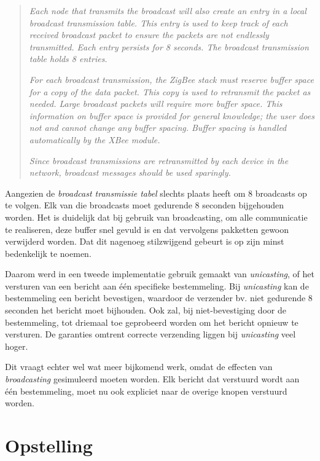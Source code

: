 \begin{quote}

\emph{Each node that transmits the broadcast will also create an entry in a
local broadcast transmission table. This entry is used to keep track of each
received broadcast packet to ensure the packets are not endlessly transmitted.
Each entry persists for 8 seconds. The broadcast transmission table holds 8
entries.}

\emph{For each broadcast transmission, the ZigBee stack must reserve buffer
space for a copy of the data packet. This copy is used to retransmit the packet
as needed. Large broadcast packets will require more buffer space. This
information on buffer space is provided for general knowledge; the user does
not and cannot change any buffer spacing. Buffer spacing is handled
automatically by the XBee module.}

\emph{Since broadcast transmissions are retransmitted by each device in the
network, broadcast messages should be used sparingly.}

\end{quote}

Aangezien de \emph{broadcast transmissie tabel} slechts plaats heeft om 8
broadcasts op te volgen. Elk van die broadcasts moet gedurende 8 seconden
bijgehouden worden. Het is duidelijk dat bij gebruik van broadcasting, om alle
communicatie te realiseren, deze buffer snel gevuld is en dat vervolgens
pakketten gewoon verwijderd worden. Dat dit nagenoeg stilzwijgend gebeurt is
op zijn minst bedenkelijk te noemen.

Daarom werd in een tweede implementatie gebruik gemaakt van \emph{unicasting},
of het versturen van een bericht aan \'e\'en specifieke bestemmeling. Bij
\emph{unicasting} kan de bestemmeling een bericht bevestigen, waardoor de
verzender bv. niet gedurende 8 seconden het bericht moet bijhouden. Ook zal,
bij niet-bevestiging door de bestemmeling, tot driemaal toe geprobeerd worden
om het bericht opnieuw te versturen. De garanties omtrent correcte verzending
liggen bij \emph{unicasting} veel hoger.

Dit vraagt echter wel wat meer bijkomend werk, omdat de effecten van
\emph{broadcasting} gesimuleerd moeten worden. Elk bericht dat verstuurd wordt
aan \'e\'en bestemmeling, moet nu ook expliciet naar de overige knopen
verstuurd worden.

\section{Opstelling}

